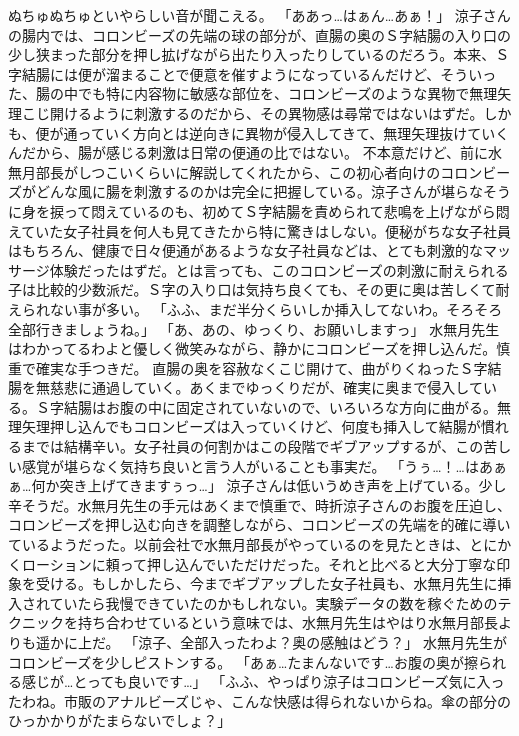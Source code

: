 ぬちゅぬちゅといやらしい音が聞こえる。
「ああっ…はぁん…あぁ！」
涼子さんの腸内では、コロンビーズの先端の球の部分が、直腸の奥のＳ字結腸の入り口の少し狭まった部分を押し拡げながら出たり入ったりしているのだろう。本来、Ｓ字結腸には便が溜まることで便意を催すようになっているんだけど、そういった、腸の中でも特に内容物に敏感な部位を、コロンビーズのような異物で無理矢理こじ開けるように刺激するのだから、その異物感は尋常ではないはずだ。しかも、便が通っていく方向とは逆向きに異物が侵入してきて、無理矢理抜けていくんだから、腸が感じる刺激は日常の便通の比ではない。
不本意だけど、前に水無月部長がしつこいくらいに解説してくれたから、この初心者向けのコロンビーズがどんな風に腸を刺激するのかは完全に把握している。涼子さんが堪らなそうに身を捩って悶えているのも、初めてＳ字結腸を責められて悲鳴を上げながら悶えていた女子社員を何人も見てきたから特に驚きはしない。便秘がちな女子社員はもちろん、健康で日々便通があるような女子社員などは、とても刺激的なマッサージ体験だったはずだ。とは言っても、このコロンビーズの刺激に耐えられる子は比較的少数派だ。Ｓ字の入り口は気持ち良くても、その更に奥は苦しくて耐えられない事が多い。
「ふふ、まだ半分くらいしか挿入してないわ。そろそろ全部行きましょうね。」
「あ、あの、ゆっくり、お願いしますっ」
水無月先生はわかってるわよと優しく微笑みながら、静かにコロンビーズを押し込んだ。慎重で確実な手つきだ。
直腸の奥を容赦なくこじ開けて、曲がりくねったＳ字結腸を無慈悲に通過していく。あくまでゆっくりだが、確実に奥まで侵入している。Ｓ字結腸はお腹の中に固定されていないので、いろいろな方向に曲がる。無理矢理押し込んでもコロンビーズは入っていくけど、何度も挿入して結腸が慣れるまでは結構辛い。女子社員の何割かはこの段階でギブアップするが、この苦しい感覚が堪らなく気持ち良いと言う人がいることも事実だ。
「うぅ…！…はあぁぁ…何か突き上げてきますぅっ…」
涼子さんは低いうめき声を上げている。少し辛そうだ。水無月先生の手元はあくまで慎重で、時折涼子さんのお腹を圧迫し、コロンビーズを押し込む向きを調整しながら、コロンビーズの先端を的確に導いているようだった。以前会社で水無月部長がやっているのを見たときは、とにかくローションに頼って押し込んでいただけだった。それと比べると大分丁寧な印象を受ける。もしかしたら、今までギブアップした女子社員も、水無月先生に挿入されていたら我慢できていたのかもしれない。実験データの数を稼ぐためのテクニックを持ち合わせているという意味では、水無月先生はやはり水無月部長よりも遥かに上だ。
「涼子、全部入ったわよ？奥の感触はどう？」
水無月先生がコロンビーズを少しピストンする。
「あぁ…たまんないです…お腹の奥が擦られる感じが…とっても良いです…」
「ふふ、やっぱり涼子はコロンビーズ気に入ったわね。市販のアナルビーズじゃ、こんな快感は得られないからね。傘の部分のひっかかりがたまらないでしょ？」
